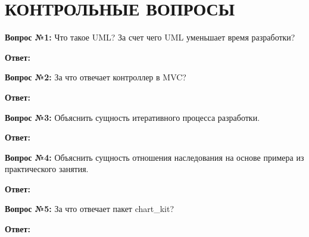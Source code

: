 \section*{КОНТРОЛЬНЫЕ ВОПРОСЫ}

\textbf{Вопрос №1:}
  Что такое UML? За счет чего UML уменьшает время разработки? 

\textbf{Ответ:}


\textbf{Вопрос №2:}
  За что отвечает контроллер в MVC?

\textbf{Ответ:}
  
\textbf{Вопрос №3:}
  Объяснить сущность итеративного процесса разработки.

\textbf{Ответ:}

\textbf{Вопрос №4:}
  Объяснить сущность отношения наследования на основе примера из практического занятия.

\textbf{Ответ:}

\textbf{Вопрос №5:}
  За что отвечает пакет chart\_kit?

\textbf{Ответ:}
  